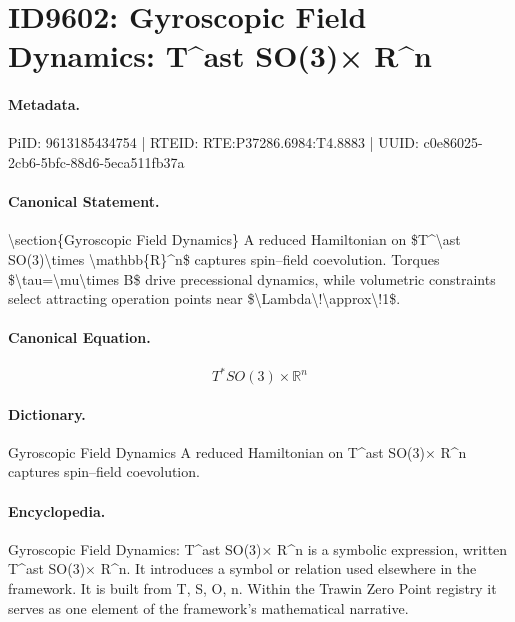 \section*{ID9602: Gyroscopic Field Dynamics: T\textasciicircum{}ast SO(3)× R\textasciicircum{}n}
\paragraph{Metadata.}
PiID: 9613185434754 | RTEID: RTE:P37286.6984:T4.8883 | UUID: c0e86025-2cb6-5bfc-88d6-5eca511fb37a

\paragraph{Canonical Statement.}
\textbackslash{}section\{Gyroscopic Field Dynamics\} A reduced Hamiltonian on \$T\textasciicircum{}\textbackslash{}ast SO(3)\textbackslash{}times \textbackslash{}mathbb\{R\}\textasciicircum{}n\$ captures spin--field coevolution. Torques \$\textbackslash{}tau=\textbackslash{}mu\textbackslash{}times B\$ drive precessional dynamics, while volumetric constraints select attracting operation points near \$\textbackslash{}Lambda\textbackslash{}!\textbackslash{}approx\textbackslash{}!1\$.

\paragraph{Canonical Equation.}
\[
T^\ast SO(3)\times \mathbb{R}^n
\]

\paragraph{Dictionary.}
Gyroscopic Field Dynamics A reduced Hamiltonian on T\textasciicircum{}ast SO(3)× R\textasciicircum{}n captures spin--field coevolution.

\paragraph{Encyclopedia.}
Gyroscopic Field Dynamics: T\textasciicircum{}ast SO(3)× R\textasciicircum{}n is a symbolic expression, written T\textasciicircum{}ast SO(3)× R\textasciicircum{}n. It introduces a symbol or relation used elsewhere in the framework. It is built from T, S, O, n. Within the Trawin Zero Point registry it serves as one element of the framework's mathematical narrative.
